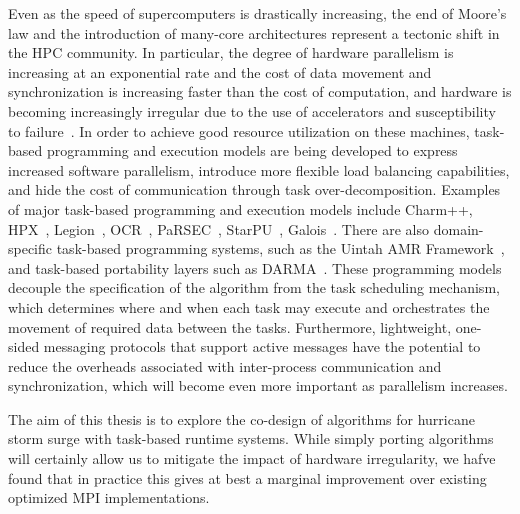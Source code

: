 Even as the speed of supercomputers is drastically increasing, the end of Moore's law and the introduction of many-core architectures represent a tectonic shift in the HPC community.
In particular, the degree of hardware parallelism is increasing at an exponential rate and the cost of data movement and synchronization is increasing faster than the cost of computation, and hardware is becoming increasingly irregular due to the use of accelerators and susceptibility to failure~\cite{Kogge2013}.
In order to achieve good resource utilization on these machines, task-based programming and execution models are being developed to express increased software parallelism, introduce more flexible load balancing capabilities, and hide the cost of communication through task over-decomposition. 
Examples of major task-based programming and execution models include Charm++, HPX~\cite{hpx2}, Legion~\cite{legion}, OCR~\cite{ocr}, PaRSEC~\cite{parsec}, StarPU~\cite{starpu}, Galois~\cite{Kulkarni2007, Pingali2011}.
There are also domain-specific task-based programming systems, such as the Uintah AMR Framework~\cite{uintah}, and task-based portability layers such as DARMA~\cite{darma}.
These programming models decouple the specification of the algorithm from the task scheduling mechanism, which determines where and when each task may execute and orchestrates the movement of required data between the tasks.
Furthermore, lightweight, one-sided messaging protocols that support active messages have the potential to reduce the overheads associated with inter-process communication and synchronization, which will become even more important as parallelism increases.

The aim of this thesis is to explore the co-design of algorithms for hurricane storm surge with task-based runtime systems. While simply porting algorithms will certainly allow us to mitigate the impact of hardware irregularity, we hafve found that in practice this gives at best a marginal improvement over existing optimized MPI implementations. 


